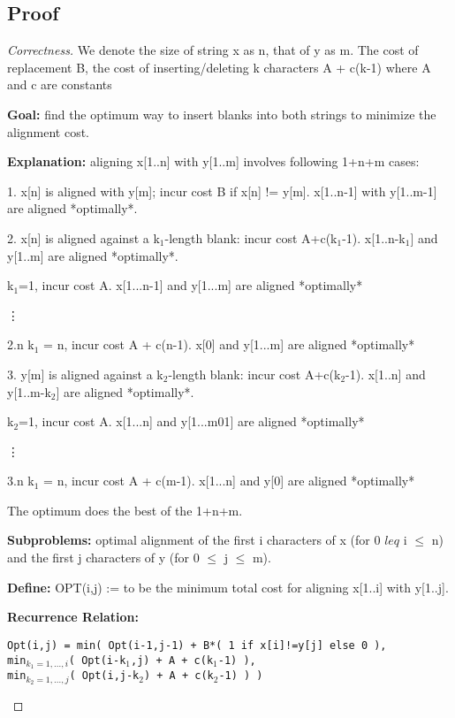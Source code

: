 \documentclass[openany]{article}
\begin{document}
\subsection*{Proof}
\begin{proof}[Correctness]{}
    We denote the size of string x as n, that of y as m. The cost of replacement B, the cost of inserting/deleting k characters A + c(k-1) where A and c are constants

    \textbf{Goal:} find the optimum way to insert blanks into both strings to minimize the alignment cost.
    
    \textbf{Explanation:} aligning x[1..n] with y[1..m] involves following 1+n+m cases:
    
    1. x[n] is aligned with y[m]; incur cost B if x[n] != y[m]. x[1..n-1] with y[1..m-1] are aligned *optimally*.
    
    2. x[n] is aligned against a k$_1$-length blank: incur cost A+c(k$_1$-1). x[1..n-k$_1$] and y[1..m] are aligned *optimally*.
    
         k$_1$=1, incur cost A. x[1...n-1] and y[1...m] are aligned *optimally*
        
        \qquad \vdots
        
        \qquad 2.n k$_1$ = n, incur cost A + c(n-1). x[0] and y[1...m] are aligned *optimally*
    
3. y[m] is aligned against a k$_2$-length blank: incur cost A+c(k$_2$-1). x[1..n] and y[1..m-k$_2$] are aligned *optimally*.

         k$_2$=1, incur cost A. x[1...n] and y[1...m01] are aligned *optimally*
        
        \qquad \vdots
        
        \qquad 3.n k$_1$ = n, incur cost A + c(m-1). x[1...n] and y[0] are aligned *optimally*

The optimum does the best of the 1+n+m.

    \textbf{Subproblems:} optimal alignment of the first i characters of x (for 0 $leq$ i $\leq$ n) and the first j characters of y (for 0 $\leq$ j $\leq$ m).
    
    \textbf{Define:} OPT(i,j) := to be the minimum total cost for aligning x[1..i] with y[1..j].
    
    \textbf{Recurrence Relation:} 
    \begin{center}
        \texttt{Opt(i,j) = min(  Opt(i-1,j-1) + B*( 1 if x[i]!=y[j] else 0 ),\\
        min$_{k_1=1,...,i}$( Opt(i-k$_1$,j) + A + c(k$_1$-1) ),\\
        min$_{k_2=1,...,j}$( Opt(i,j-k$_2$) + A + c(k$_2$-1) )  )}
    \end{center}
    

\end{proof}
\end{document}
